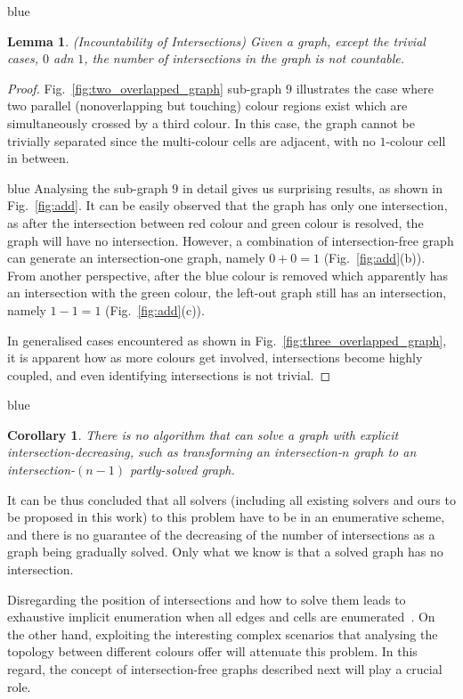 \documentclass[journal]{IEEEtran}
\newtheorem{lemma}[theorem]{Lemma}
\newtheorem{corollary}[theorem]{Corollary}
\begin{document}
\begin{color}{blue}
\begin{lemma}
(Incountability of Intersections) Given a graph, except the trivial cases, $0$ adn $1$, the number of intersections in the graph is not countable. 
\end{lemma}
\end{color}
\begin{proof}
Fig.~\ref{fig:two_overlapped_graph} sub-graph $9$ illustrates the case where two parallel (nonoverlapping but touching) colour regions exist which are simultaneously crossed by a third colour. In this case, the graph cannot be trivially separated since the multi-colour cells are adjacent, with no $1$-colour cell in between. 

\begin{color}{blue}
Analysing the sub-graph $9$ in detail gives us surprising results, as shown in Fig.~\ref{fig:add}. 
It can be easily observed that the graph has only one intersection, as after the intersection between red colour and green colour is resolved, the graph will have no intersection. 
However, a combination of intersection-free graph can generate an intersection-one graph, namely $0+0 = 1$ (Fig.~\ref{fig:add}(b)). 
From another perspective, after the blue colour is removed which apparently has an intersection with the green colour, the left-out graph still has an intersection, namely $1-1 = 1$ (Fig.~\ref{fig:add}(c)). 
\end{color}

In generalised cases encountered as shown in Fig.~\ref{fig:three_overlapped_graph}, it is apparent how as more colours get involved, intersections become highly coupled, and even identifying intersections is not trivial. 
\end{proof}

\begin{color}{blue}
\begin{corollary}
There is no algorithm that can solve a graph with explicit intersection-decreasing, such as transforming an intersection-$n$ graph to an intersection-$(n-1)$ partly-solved graph.
\end{corollary}

It can be thus concluded that all solvers (including all existing solvers and ours to be proposed in this work) to this problem have to be in an enumerative scheme, and there is no guarantee of the decreasing of the number of intersections as a graph being gradually solved. Only what we know is that a solved graph has no intersection. 
\end{color}
Disregarding the position of intersections and how to solve them leads to exhaustive implicit enumeration when all edges and cells are enumerated~\cite{Yang2020Cellular}. 
On the other hand, exploiting the interesting complex scenarios that analysing the topology between different colours offer will attenuate this problem. In this regard, the concept of intersection-free graphs described next will play a crucial role.  
\end{document}
